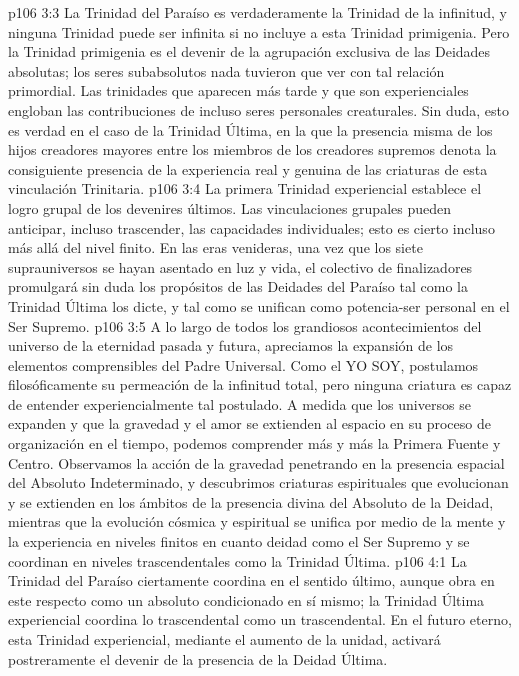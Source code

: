 \vs p106 3:3 La Trinidad del Paraíso es verdaderamente la Trinidad de la infinitud, y ninguna Trinidad puede ser infinita si no incluye a esta Trinidad primigenia. Pero la Trinidad primigenia es el devenir de la agrupación exclusiva de las Deidades absolutas; los seres subabsolutos nada tuvieron que ver con tal relación primordial. Las trinidades que aparecen más tarde y que son experienciales engloban las contribuciones de incluso seres personales creaturales. Sin duda, esto es verdad en el caso de la Trinidad Última, en la que la presencia misma de los hijos creadores mayores entre los miembros de los creadores supremos denota la consiguiente presencia de la experiencia real y genuina de las criaturas  de esta vinculación Trinitaria.
\vs p106 3:4 La primera Trinidad experiencial establece el logro grupal de los devenires últimos. Las vinculaciones grupales pueden anticipar, incluso trascender, las capacidades individuales; esto es cierto incluso más allá del nivel finito. En las eras venideras, una vez que los siete suprauniversos se hayan asentado en luz y vida, el colectivo de finalizadores promulgará sin duda los propósitos de las Deidades del Paraíso tal como la Trinidad Última los dicte, y tal como se unifican como potencia\hyp{}ser personal en el Ser Supremo.
\vs p106 3:5 \pc A lo largo de todos los grandiosos acontecimientos del universo de la eternidad pasada y futura, apreciamos la expansión de los elementos comprensibles del Padre Universal. Como el YO SOY, postulamos filosóficamente su permeación de la infinitud total, pero ninguna criatura es capaz de entender experiencialmente tal postulado. A medida que los universos se expanden y que la gravedad y el amor se extienden al espacio en su proceso de organización en el tiempo, podemos comprender más y más la Primera Fuente y Centro. Observamos la acción de la gravedad penetrando en la presencia espacial del Absoluto Indeterminado, y descubrimos criaturas espirituales que evolucionan y se extienden en los ámbitos de la presencia divina del Absoluto de la Deidad, mientras que la evolución cósmica y espiritual se unifica por medio de la mente y la experiencia en niveles finitos en cuanto deidad como el Ser Supremo y se coordinan en niveles trascendentales como la Trinidad Última.
\vs p106 4:1 La Trinidad del Paraíso ciertamente coordina en el sentido último, aunque obra en este respecto como un absoluto condicionado en sí mismo; la Trinidad Última experiencial coordina lo trascendental como un trascendental. En el futuro eterno, esta Trinidad experiencial, mediante el aumento de la unidad, activará postreramente el devenir de la presencia de la Deidad Última.
